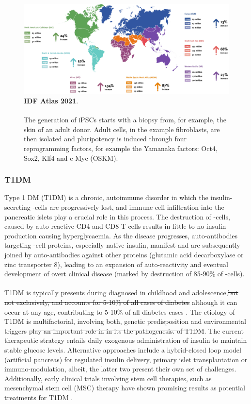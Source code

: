 \begin{figure}[t]
\centering
\includegraphics[width=14cm]{Chapter1/Fig/IDF.png}
\caption[diabetes]{\textbf{IDF Atlas 2021}.\\\\
The generation of iPSCs starts with a biopsy from, for example, the skin of an adult donor.
Adult cells, in the example fibroblasts, are then isolated and pluripotency is induced through four reprogramming factors, for example the Yamanaka factors: Oct4, Sox2, Klf4 and c-Myc (OSKM).}
\end{figure}

\subsubsection{T1DM}

Type 1 DM (T1DM) is a chronic, autoimmune disorder in which the insulin-secreting \textbeta-cells are progressively lost, and immune cell infiltration into the pancreatic islets play a crucial role in this process. The destruction of \textbeta-cells, caused by auto-reactive CD4 and CD8 T-cells results in little to no insulin production causing hyperglycaemia. As the disease progresses, auto-antibodies targeting \textbeta-cell proteins, especially native insulin, manifest and are subsequently joined by auto-antibodies against other proteins (glutamic acid decarboxylase or zinc transporter 8), leading to an expansion of auto-reactivity and eventual development of overt clinical disease (marked by destruction of 85-90\% of \textbeta-cells).
\\\\
T1DM is typically presents during diagnosed in childhood and adolescence,\st{but not exclusively, and accounts for 5-10\% of all cases of diabetes} although it can occur at any age, contributing to 5-10\% of all diabetes cases \textbf{\cite{banday_pathophysiology_2020}}. The etiology of T1DM is multifactorial, involving both, genetic predisposition and environmental triggers \st{play an important role in in its the pathogenesis. of T1DM}. The current therapeutic strategy entails daily exogenous administration of insulin to maintain stable glucose levels. Alternative approaches include a hybrid-closed loop model (artificial pancreas) for regulated insulin delivery, primary islet transplantation or immuno-modulation, albeit, the latter two present their own set of challenges. Additionally, early clinical trials involving stem cell therapies, such as mesenchymal stem cell (MSC) therapy have shown promising results as potential treatments for T1DM \textbf{\cite{pathak_therapies_2019}}.

